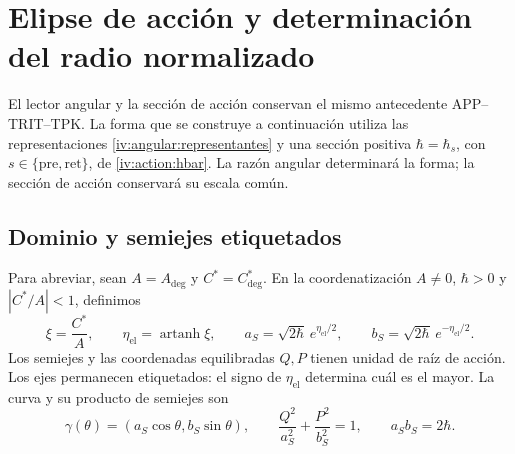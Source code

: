 \section{Elipse de acción y determinación del radio normalizado}
\label{iv:ellipse:section}

El lector angular y la sección de acción conservan el mismo
antecedente APP--TRIT--TPK. La forma que se construye a
continuación utiliza las representaciones
\eqref{iv:angular:representantes} y una sección positiva
\(\hbar=\hbar_s\), con
\(s\in\{\mathrm{pre},\mathrm{ret}\}\), de
\eqref{iv:action:hbar}. La razón angular determinará la forma;
la sección de acción conservará su escala común.

\subsection{Dominio y semiejes etiquetados}
\label{iv:ellipse:dominio}

Para abreviar, sean \(A=A_{\deg}\) y \(C^*=C^*_{\deg}\).
En la coordenatización \(A\ne0\), \(\hbar>0\) y \(|C^*/A|<1\),
definimos
\begin{equation}
 \xi=\frac{C^*}{A},\qquad
 \eta_{\mathrm{el}}=\operatorname{artanh}\xi,\qquad
 a_S=\sqrt{2\hbar}\,e^{\eta_{\mathrm{el}}/2},\qquad
 b_S=\sqrt{2\hbar}\,e^{-\eta_{\mathrm{el}}/2}.
 \label{iv:ellipse:semiejes}
\end{equation}
Los semiejes y las coordenadas equilibradas \(Q,P\) tienen
unidad de raíz de acción. Los ejes permanecen etiquetados:
el signo de \(\eta_{\mathrm{el}}\) determina cuál es el
mayor. La curva y su producto de semiejes son
\begin{equation}
 \gamma(\theta)=(a_S\cos\theta,b_S\sin\theta),\qquad
 \frac{Q^2}{a_S^2}+\frac{P^2}{b_S^2}=1,\qquad
 a_Sb_S=2\hbar.
 \label{iv:ellipse:curva}
\end{equation}

